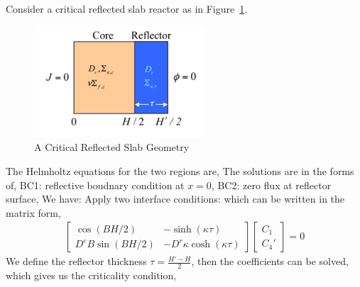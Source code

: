 \documentclass{school-22.211-notes}
\begin{document}
\clearpage
{}\label{critical-reflected-slab}
Consider a critical reflected slab reactor as in Figure~\ref{reflected-slab}. 
\begin{figure}[ht]
  \centering
\includegraphics[width=2.5in]{images/dfs/reflected-slab.png}
\caption{A Critical Reflected Slab Geometry} \label{reflected-slab}
\end{figure}
The Helmholtz equations for the two regions are,
The solutions are in the forms of,
BC1: reflective boudnary condition at $x=0$, BC2: zero flux at reflector surface, 
We have: 
Apply two interface conditions: 
which can be written in the matrix form, 
\begin{align}
\left[ \begin{array}{cc}
\cos (BH/2) & -\sinh(\kappa \tau) \\
D^c B \sin(BH/2) & -D^r \kappa \cosh(\kappa \tau) 
\end{array} \right] 
\left[ \begin{array}{c} 
C_1 \\ C_4' \end{array} \right] = 0
\end{align}
We define the reflector thickness $\tau = \frac{H' - H}{2}$, then the coefficients can be solved,
which gives us the criticality condition,
\end{document}
